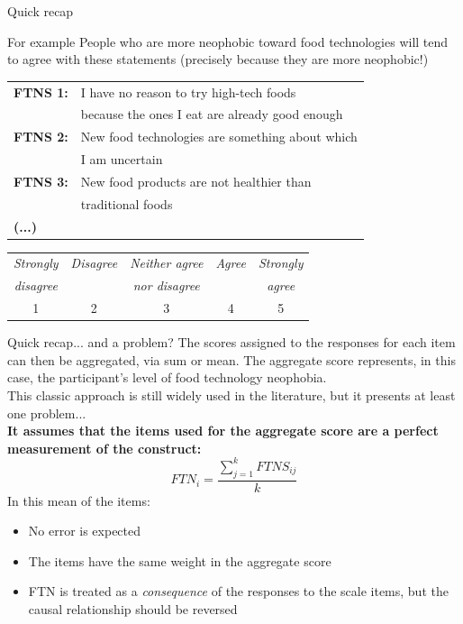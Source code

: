 \documentclass{beamer}
\begin{document}
\begin{frame}{Quick recap}
  \begin{block}{For example}
    People who are more neophobic toward food technologies will tend to agree with these statements (precisely because they are more neophobic!)
  \end{block}
  \vspace{0.3cm}
  \footnotesize
  \begin{tabular}{l l}
    \textbf{FTNS 1:} & I have no reason to try high-tech foods \\
    & because the ones I eat are already good enough \\
    \textbf{FTNS 2:} & New food technologies are something about which \\
    & I am uncertain \\
    \textbf{FTNS 3:} & New food products are not healthier than \\ 
    & traditional foods \\
    \textbf{(...)}
  \end{tabular}
  \vspace{0.2cm}
  \begin{center}
    \footnotesize
    \begin{tabular}{ccccc}
      \toprule
      \textit{Strongly} & \textit{Disagree} & \textit{Neither agree} & \textit{Agree} & \textit{Strongly} \\
      \textit{disagree} &  & \textit{nor disagree} &  & \textit{agree} \\
      \midrule
      1 & 2 & 3 & 4 & 5 \\
      \bottomrule
    \end{tabular}
  \end{center}
\end{frame}

\begin{frame}{Quick recap... and a problem?}
    The scores assigned to the responses for each item can then be aggregated, via sum or mean. The aggregate score represents, in this case, the participant's level of food technology neophobia.\\
    This classic approach is still widely used in the literature, but it presents at least one problem... \\
    \pause
    \vspace{1em}
    \textbf{It assumes that the items used for the aggregate score are a perfect measurement of the construct:} \\
    \[
    FTN_i = \frac{\sum_{j=1}^{k} FTNS_{ij}}{k}
    \]
    \small
    In this mean of the items:
    \begin{itemize}
        \item No error is expected
        \item The items have the same weight in the aggregate score
        \item FTN is treated as a \textit{consequence} of the responses to the scale items, but the causal relationship should be reversed
    \end{itemize}
\end{frame}
\end{document}
